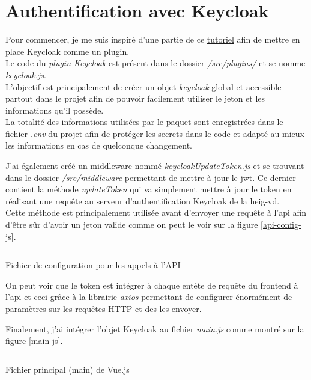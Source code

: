 \documentclass[
    iai, %
    il, %
]{heig-tb}
\begin{document}
\section{Authentification avec Keycloak}
Pour commencer, je me suis inspiré d'une partie de ce \href{https://davidtruxall.com/secure-a-vue-js-app-with-keycloak/}{tutoriel} afin de mettre en place Keycloak comme un plugin. \\
Le code du \emph{plugin Keycloak} est présent dans le dossier \emph{/src/plugins/} et se nomme \emph{keycloak.js}. \\
L'objectif est principalement de créer un objet \emph{keycloak} global et accessible partout dans le projet afin de pouvoir facilement utiliser le jeton et les informations qu'il possède. \\
La totalité des informations utilisées par le paquet sont enregistrées dans le fichier \emph{.env} du projet afin de protéger les secrets dans le code et adapté au mieux les informations en cas de quelconque changement.

J'ai également créé un middleware nommé \emph{keycloakUpdateToken.js} et se trouvant dans le dossier \emph{/src/middleware} permettant de mettre à jour le \Gls{jwt}. Ce dernier contient la méthode \emph{updateToken} qui va simplement mettre à jour le token en réalisant une requête au serveur d'authentification Keycloak de la \Gls{heig-vd}. \\
Cette méthode est principalement utilisée avant d'envoyer une requête à l'\Gls{api} afin d'être sûr d'avoir un jeton valide comme on peut le voir sur la figure \ref{api-config-js}. \\

\begin{listing}[h]
    \inputminted{js}{assets/code/apiConfig.js}
    \caption{Fichier de configuration pour les appels à l'API \label{api-config-js}}
\end{listing}

On peut voir que le token est intégrer à chaque entête de requête du \Gls{frontend} à l'\Gls{api} et ceci grâce à la librairie \href{https://axios-http.com/fr/docs/intro}{\emph{axios}} permettant de configurer énormément de paramètres sur les requêtes HTTP et des les envoyer.

Finalement, j'ai intégrer l'objet Keycloak au fichier \emph{main.js} comme montré sur la figure \ref{main-js}.

\begin{listing}[h]
    \inputminted{js}{assets/code/main.js}
    \caption{Fichier principal (main) de Vue.js \label{main-js}}
\end{listing}
\end{document}
